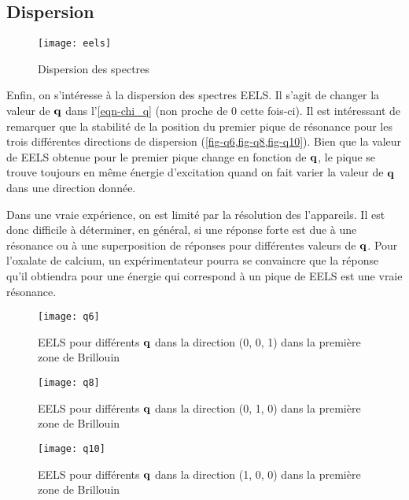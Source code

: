 \subsection{Dispersion}
\begin{wrapfigure}[25]{r}{0.4\textwidth}
  \centering
  \texttt{[image: eels]}
  \caption{Dispersion des spectres}\label{fig-dispersion}
\end{wrapfigure}
Enfin, on s'intéresse à la dispersion des spectres EELS\@.
Il s'agit de changer la valeur de $\vb{q}$ dans l'\cref{eqn-chi_q} (non proche de 0 cette fois-ci).
Il est intéressant de remarquer que la stabilité de la position du premier pique de résonance
pour les trois différentes directions de dispersion (\cref{fig-q6,fig-q8,fig-q10}).
Bien que la valeur de EELS obtenue pour le premier pique change en fonction de $\vb{q}$,
le pique se trouve toujours en même énergie d'excitation
quand on fait varier la valeur de $\vb{q}$ dans une direction donnée.

Dans une vraie expérience, on est limité par la résolution des l'appareils.
Il est donc difficile à déterminer, en général, si une réponse forte est due
à une résonance ou à une superposition de réponses pour différentes valeurs de $\vb{q}$.
Pour l'oxalate de calcium, un expérimentateur pourra se convaincre que la réponse qu'il obtiendra
pour une énergie qui correspond à un pique de EELS est une vraie résonance.

\begin{figure}[!b]
    \centering
    \texttt{[image: q6]}
    \captionsetup{width=0.6\textwidth}
    \caption{EELS pour différents $\vb{q}$ dans la direction (0, 0, 1) dans la première zone de Brillouin}\label{fig-q6}
\end{figure}
\clearpage
\begin{figure}[!htb]
    \centering
    \texttt{[image: q8]}
    \captionsetup{width=0.6\textwidth}
    \caption{EELS pour différents $\vb{q}$ dans la direction (0, 1, 0) dans la première zone de Brillouin}\label{fig-q8}
\end{figure}

\begin{figure}[!htb]
    \centering
    \texttt{[image: q10]}
    \captionsetup{width=0.6\textwidth}
    \caption{EELS pour différents $\vb{q}$ dans la direction (1, 0, 0) dans la première zone de Brillouin}\label{fig-q10}
\end{figure}
